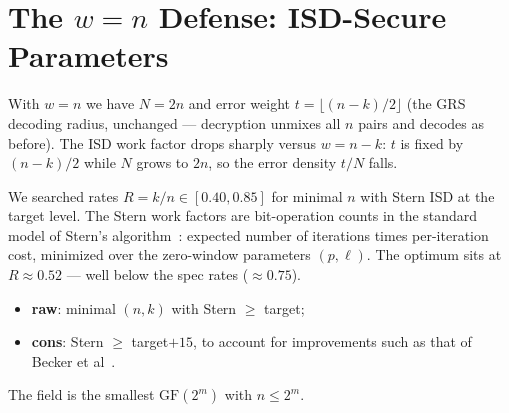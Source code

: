 \section{The $w=n$ Defense: ISD-Secure Parameters}\label{sec:wn-params}


With $w=n$ we have $N=2n$ and error weight $t=\lfloor(n-k)/2\rfloor$ (the GRS
decoding radius, unchanged --- decryption unmixes all $n$ pairs and decodes as
before). The ISD work factor drops sharply versus $w=n-k$: $t$ is fixed by
$(n-k)/2$ while $N$ grows to $2n$, so the error density $t/N$ falls.

We searched rates $R=k/n\in[0.40,0.85]$ for minimal $n$ with Stern ISD
at the target level. The Stern work factors are bit-operation counts in
the standard model of Stern's algorithm~\cite{Stern89}: expected
number of iterations times per-iteration cost, minimized over the
zero-window parameters $(p, \ell)$. The optimum sits at $R\approx 0.52$ --- well below the
spec rates ($\approx 0.75$).
\begin{itemize}
    \item \textbf{raw}: minimal $(n,k)$ with Stern $\geq$ target;
    \item \textbf{cons}: Stern $\geq$ target$+15$, to account for improvements such as that of Becker et al~\cite{DBLP:conf/eurocrypt/BeckerJMM12}. 
\end{itemize}
The field is the smallest $\mathrm{GF}(2^m)$ with $n\leq 2^m$.

